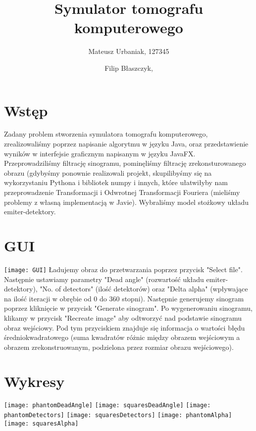 \documentclass[a4paper,11pt]{article}
\title {Symulator tomografu komputerowego}
\author{Mateusz Urbaniak, 127345 \and Filip Błaszczyk,}
\begin{document}
\maketitle

\section{Wstęp}
Zadany problem stworzenia symulatora tomografu komputerowego, zrealizowaliśmy poprzez napisanie algorytmu w języku Java, oraz przedstawienie wyników w interfejsie graficznym napisanym w języku JavaFX. Przeprowadziliśmy filtrację sinogramu, pominęliśmy filtrację zrekonsturowanego obrazu (gdybyśmy ponownie realizowali projekt, skupilibyśmy się na wykorzystaniu Pythona i bibliotek numpy i innych, które ułatwiłyby nam przeprowadzenie Transformacji i Odwrotnej Transformacji Fouriera (mieliśmy problemy z własną implementacją w Javie). Wybraliśmy model stożkowy układu emiter-detektory.

\section{GUI}
\texttt{[image: GUI]}
Ładujemy obraz do przetwarzania poprzez przycisk "Select file".
Następnie ustawiamy parametry "Dead angle" (rozwartość układu emiter-detektory), "No. of detectors" (ilość detektorów) oraz "Delta alpha" (wpływające na ilość iteracji w obrębie od 0 do 360 stopni). Następnie generujemy sinogram poprzez kliknięcie w przycisk "Generate sinogram". Po wygenerowaniu sinogramu, klikamy w przycisk "Recreate image" aby odtworzyć nad podstawie sinogramu obraz wejściowy. Pod tym przyciskiem znajduje się informacja o wartości błędu średniokwadratowego (suma kwadratów różnic między obrazem wejściowym a obrazem zrekonstruowanym, podzielona przez rozmiar obrazu wejściowego).

\section{Wykresy}
\texttt{[image: phantomDeadAngle]}
\texttt{[image: squaresDeadAngle]}
\texttt{[image: phantomDetectors]}
\texttt{[image: squaresDetectors]}
\texttt{[image: phantomAlpha]}
\texttt{[image: squaresAlpha]}
\end{document}

